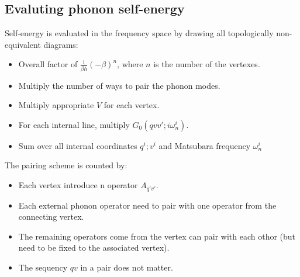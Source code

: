 \documentclass{article}
\begin{document}
\subsection{Evaluting phonon self-energy}
Self-energy is evaluated in the frequency space by drawing all topologically non-equivalent diagrams:
\begin{itemize}
    \item Overall factor of $\frac{1}{\beta\hbar} (-\beta)^n$, where $n$ is the number of the vertexes.
    \item Multiply the number of ways to pair the phonon modes.
    \item Multiply appropriate $V$ for each vertex.
    \item For each internal line, multiply $G_0(qvv';i\omega^i_n)$.
    \item Sum over all internal coordinates $q^i;v^i$ and Matsubara frequency $\omega_n^i$
\end{itemize}
The pairing scheme is counted by:
\begin{itemize}
    \item Each vertex introduce n operator $A_{q'v'}$.
    \item Each external phonon operator need to pair with one operator from the connecting vertex.
    \item The remaining operators come from the vertex can pair with each othor (but need to be fixed to the associated vertex).
    \item The sequency $qv$ in a pair does not matter. 
\end{itemize}
\pagebreak
\end{document}
